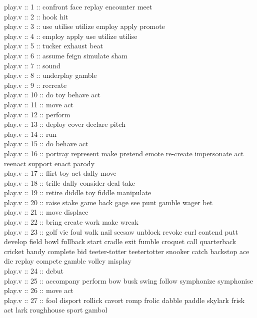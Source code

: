 \documentclass[12pt]{article}
\begin{document}
\begin{itemize}
	play.v :: 1 :: confront face replay encounter meet \\
	play.v :: 2 :: hook hit \\
	play.v :: 3 :: use utilise utilize employ apply promote \\
	play.v :: 4 :: employ apply use utilize utilise \\
	play.v :: 5 :: tucker exhaust beat \\
	play.v :: 6 :: assume feign simulate sham \\
	play.v :: 7 :: sound \\
	play.v :: 8 :: underplay gamble \\
	play.v :: 9 :: recreate \\
	play.v :: 10 :: do toy behave act \\
	play.v :: 11 :: move act \\ 
	play.v :: 12 :: perform \\
	play.v :: 13 :: deploy cover declare pitch \\
	play.v :: 14 :: run\\
	play.v :: 15 :: do behave act \\
	play.v :: 16 :: portray represent make pretend emote re-create impersonate act reenact support enact parody \\
	play.v :: 17 :: flirt toy act dally move \\
	play.v :: 18 :: trifle dally consider deal take \\
	play.v :: 19 :: retire diddle toy fiddle manipulate \\
	play.v :: 20 :: raise stake game back gage see punt gamble wager bet \\
	play.v :: 21 :: move displace \\
	play.v :: 22 :: bring create work make wreak \\
	play.v :: 23 :: golf vie foul walk nail seesaw unblock revoke curl contend putt develop field bowl fullback start cradle exit fumble croquet call quarterback cricket bandy complete bid teeter-totter teetertotter snooker catch backstop ace die replay compete gamble volley misplay \\
	play.v :: 24 :: debut \\
	play.v :: 25 :: accompany perform bow busk swing follow symphonize symphonise \\
	play.v :: 26 :: move act \\
	play.v :: 27 :: fool disport rollick cavort romp frolic dabble paddle skylark frisk act lark roughhouse sport gambol \\

\end{itemize}
\end{document}

